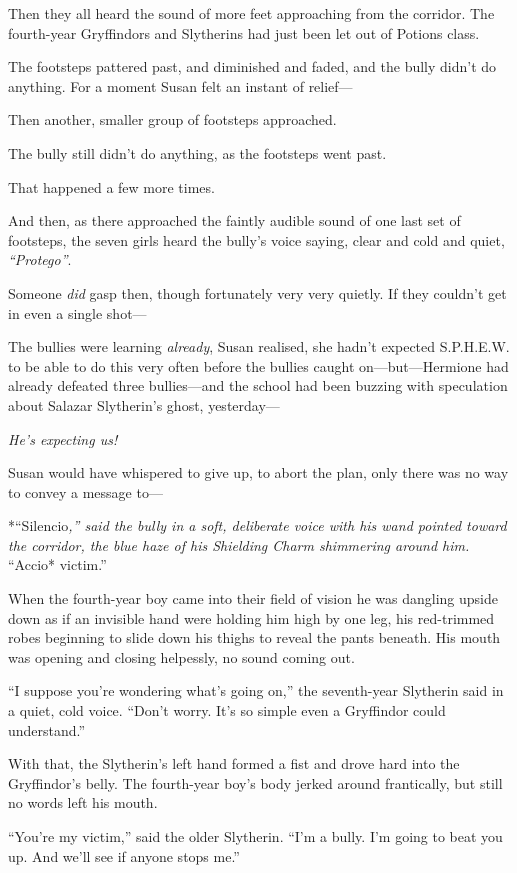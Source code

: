 Then they all heard the sound of more feet approaching from the
corridor. The fourth-year Gryffindors and Slytherins had just been let
out of Potions class.

The footsteps pattered past, and diminished and faded, and the bully
didn't do anything. For a moment Susan felt an instant of relief---

Then another, smaller group of footsteps approached.

The bully still didn't do anything, as the footsteps went past.

That happened a few more times.

And then, as there approached the faintly audible sound of one last set
of footsteps, the seven girls heard the bully's voice saying, clear and
cold and quiet, \emph{``Protego''}.

Someone \emph{did} gasp then, though fortunately very very quietly. If
they couldn't get in even a single shot---

The bullies were learning \emph{already}, Susan realised, she hadn't
expected S.P.H.E.W. to be able to do this very often before the bullies
caught on---but---Hermione had already defeated three bullies---and the
school had been buzzing with speculation about Salazar Slytherin's
ghost, yesterday---

\emph{He's expecting us!}

Susan would have whispered to give up, to abort the plan, only there was
no way to convey a message to---

*``Silencio\emph{,'' said the bully in a soft, deliberate voice with his
wand pointed toward the corridor, the blue haze of his Shielding Charm
shimmering around him. }``Accio* victim.''

When the fourth-year boy came into their field of vision he was dangling
upside down as if an invisible hand were holding him high by one leg,
his red-trimmed robes beginning to slide down his thighs to reveal the
pants beneath. His mouth was opening and closing helpessly, no sound
coming out.

``I suppose you're wondering what's going on,'' the seventh-year
Slytherin said in a quiet, cold voice. ``Don't worry. It's so simple
even a Gryffindor could understand.''

With that, the Slytherin's left hand formed a fist and drove hard into
the Gryffindor's belly. The fourth-year boy's body jerked around
frantically, but still no words left his mouth.

``You're my victim,'' said the older Slytherin. ``I'm a bully. I'm going
to beat you up. And we'll see if anyone stops me.''

